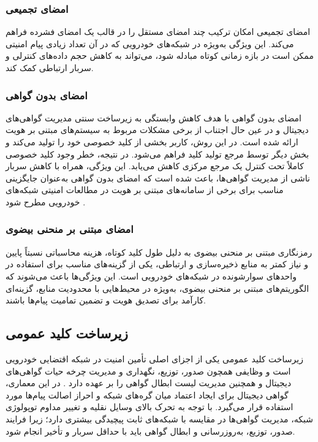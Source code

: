 \documentclass[12pt,a4paper]{article}
\begin{document}
\subsubsection{امضای تجمیعی}
امضای تجمیعی امکان ترکیب چند امضای مستقل را در قالب یک امضای فشرده فراهم می‌کند. این ویژگی به‌ویژه در شبکه‌های خودرویی که در آن تعداد زیادی پیام امنیتی ممکن است در بازه زمانی کوتاه مبادله شود، می‌تواند به کاهش حجم داده‌های کنترلی و سربار ارتباطی کمک کند.

\subsubsection{امضای بدون گواهی}
امضای بدون گواهی با هدف کاهش وابستگی به زیرساخت سنتی مدیریت گواهی‌های دیجیتال و در عین حال اجتناب از برخی مشکلات مربوط به سیستم‌های مبتنی بر هویت ارائه شده است. در این روش، کاربر بخشی از کلید خصوصی خود را تولید می‌کند و بخش دیگر توسط مرجع تولید کلید فراهم می‌شود. در نتیجه، خطر وجود کلید خصوصی کاملاً تحت کنترل یک مرجع مرکزی کاهش می‌یابد. این ویژگی، همراه با کاهش سربار ناشی از مدیریت گواهی‌ها، باعث شده است که امضای بدون گواهی به‌عنوان جایگزینی مناسب برای برخی از سامانه‌های مبتنی بر هویت در مطالعات امنیتی شبکه‌های خودرویی مطرح شود \cite{rahmawatiagustinaSystematicLiteratureReview2025}.

\subsubsection{امضای مبتنی بر منحنی بیضوی}
رمزنگاری مبتنی بر منحنی بیضوی به دلیل طول کلید کوتاه، هزینه محاسباتی نسبتاً پایین و نیاز کمتر به منابع ذخیره‌سازی و ارتباطی، یکی از گزینه‌های مناسب برای استفاده در واحدهای سوارشونده در شبکه‌های خودرویی است. این ویژگی‌ها باعث می‌شوند که الگوریتم‌های مبتنی بر منحنی بیضوی، به‌ویژه در محیط‌هایی با محدودیت منابع، گزینه‌ای کارآمد برای تصدیق هویت و تضمین تمامیت پیام‌ها باشند.

\subsection{زیرساخت کلید عمومی}

زیرساخت کلید عمومی یکی از اجزای اصلی تأمین امنیت در شبکه اقتضایی خودرویی است و وظایفی همچون صدور، توزیع، نگهداری و مدیریت چرخه حیات گواهی‌های دیجیتال و همچنین مدیریت لیست ابطال گواهی را بر عهده دارد \cite{VanetSecurityPrivacy}. در این معماری، گواهی دیجیتال برای ایجاد اعتماد میان گره‌های شبکه و احراز اصالت پیام‌ها مورد استفاده قرار می‌گیرد. با توجه به تحرک بالای وسایل نقلیه و تغییر مداوم توپولوژی شبکه، مدیریت گواهی‌ها در مقایسه با شبکه‌های ثابت پیچیدگی بیشتری دارد؛ زیرا فرایند صدور، توزیع، به‌روزرسانی و ابطال گواهی باید با حداقل سربار و تأخیر انجام شود.
\end{document}
